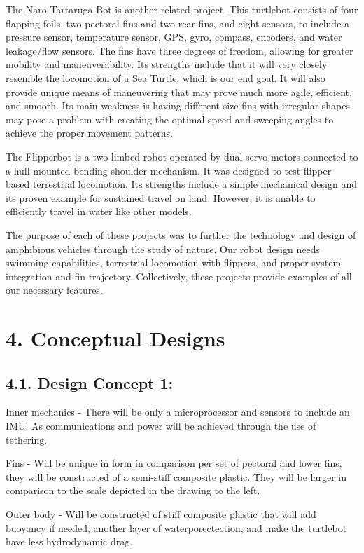 \documentclass[10pt]{article}
\begin{document}
The Naro Tartaruga Bot \cite{siegenthaler2013system} is another related project. This turtlebot consists of four flapping foils, two pectoral fins and two rear fins, and eight sensors, to include a pressure sensor, temperature sensor, GPS, gyro, compass, encoders, and water leakage/flow sensors. The fins have three degrees of freedom, allowing for greater mobility and maneuverability. Its strengths include that it will very closely resemble the locomotion of a Sea Turtle, which is our end goal. It will also provide unique means of maneuvering that may prove much more agile, efficient, and smooth. Its main weakness is having different size fins with irregular shapes may pose a problem with creating the optimal speed and sweeping angles to achieve the proper movement patterns.

The Flipperbot \cite{mazouchova2013flipper} is a two-limbed robot operated by dual servo motors connected to a hull-mounted bending shoulder mechanism. It was designed to test flipper-based terrestrial locomotion. Its strengths include a simple mechanical design and its proven example for sustained travel on land. However, it is unable to efficiently travel in water like other models. 

The purpose of each of these projects was to further the technology and design of amphibious vehicles through the study of nature. Our robot design needs swimming capabilities, terrestrial locomotion with flippers, and proper system integration and fin trajectory. Collectively, these projects provide examples of all our necessary features. 

\section{4. Conceptual Designs}
\subsection{4.1. Design Concept 1:} 
Inner mechanics - There will be only a microprocessor and sensors to include an IMU.  As communications and power will be achieved through the use of tethering. 

Fins - Will be unique in form in comparison per set of pectoral and lower fins, they will be constructed of a semi-stiff composite plastic. They will be larger in comparison to the scale depicted in the drawing to the left. 

Outer body - Will be constructed of stiff composite plastic that will add buoyancy if needed, another layer of waterporectection, and make the turtlebot have less hydrodynamic drag. 
\end{document}
